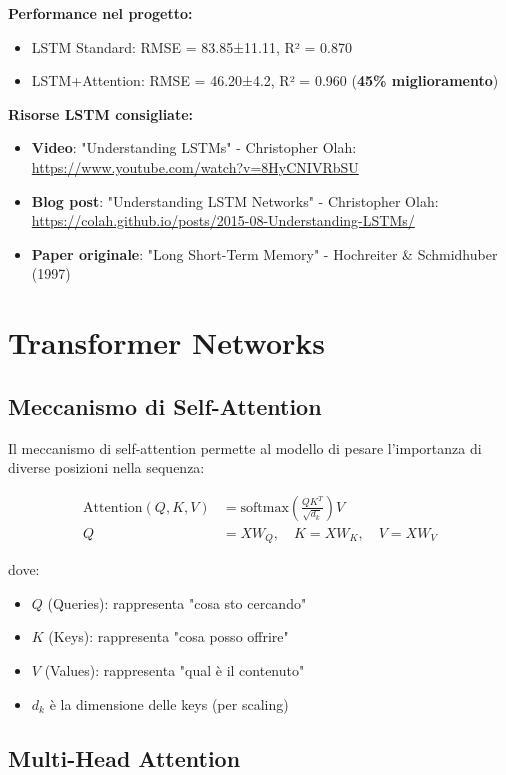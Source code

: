 \documentclass[12pt,a4paper,twoside]{report}
\begin{document}
\textbf{Performance nel progetto:}
\begin{itemize}
    \item LSTM Standard: RMSE = 83.85±11.11, R² = 0.870
    \item LSTM+Attention: RMSE = 46.20±4.2, R² = 0.960 (\textbf{45\% miglioramento})
\end{itemize}

\textbf{Risorse LSTM consigliate:}
\begin{itemize}
    \item \textbf{Video}: "Understanding LSTMs" - Christopher Olah: \url{https://www.youtube.com/watch?v=8HyCNIVRbSU}
    \item \textbf{Blog post}: "Understanding LSTM Networks" - Christopher Olah: \url{https://colah.github.io/posts/2015-08-Understanding-LSTMs/}
    \item \textbf{Paper originale}: "Long Short-Term Memory" - Hochreiter \& Schmidhuber (1997)
\end{itemize}

\section{Transformer Networks}

\subsection{Meccanismo di Self-Attention}

Il meccanismo di self-attention permette al modello di pesare l'importanza di diverse posizioni nella sequenza:

\begin{align}
\text{Attention}(Q, K, V) &= \text{softmax}\left(\frac{QK^T}{\sqrt{d_k}}\right)V \\
Q &= XW_Q, \quad K = XW_K, \quad V = XW_V
\end{align}

dove:
\begin{itemize}
    \item $Q$ (Queries): rappresenta "cosa sto cercando"
    \item $K$ (Keys): rappresenta "cosa posso offrire"
    \item $V$ (Values): rappresenta "qual è il contenuto"
    \item $d_k$ è la dimensione delle keys (per scaling)
\end{itemize}

\subsection{Multi-Head Attention}
\end{document}
